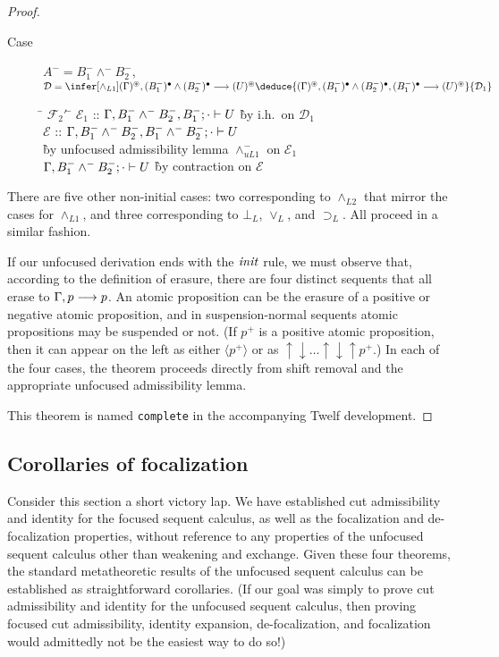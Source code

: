 \documentclass[acmtocl]{robtrans}\pdfoutput=1
\newcommand{\seq}[2]{{#1} \longrightarrow {#2} \mathstrut}
\newcommand{\susp}[1]{\langle{#1}\rangle}
\newcommand{\ifoc}[3]{{#1}; {#2} \vdash {#3} \mathstrut}
\begin{document}
\begin{proof}
\begin{description}
\item[Case] $A^- = B_1^- \wedge^- B_2^-$, \quad
$\mathcal D = \infer[\wedge_{L1}]
{\seq{(\Gamma)^\circledast, (B_1^-)^\bullet \wedge (B_2^-)^\bullet}{(U)^\circledast}}
{\deduce{\seq{(\Gamma)^\circledast, (B_1^-)^\bullet \wedge (B_2^-)^\bullet, (B_1^-)^\bullet}{(U)^\circledast}}{\mathcal D_1}}$

\begin{tabbing}
\qquad \= $\mathcal F_2'$ \= \kill
\>
$\mathcal E_1$ \> ::
 $\ifoc{\Gamma, B_1^- \wedge^- B_2^-, B_1^-}{\cdot}{U}$
  \` by i.h.~on $\mathcal D_1$\\
\> $\mathcal E$ \> ::
$\ifoc{\Gamma, B_1^- \wedge^- B_2^-, B_1^- \wedge^- B_2^-}{\cdot}{U}$\\
  \` by unfocused admissibility lemma $\wedge^-_{uL1}$ on $\mathcal E_1$ \\
\> $\ifoc{\Gamma, B_1^- \wedge^- B_2^-}{\cdot}{U}$
  \` by contraction on $\mathcal E$
\end{tabbing}

\end{description}
There are five other non-initial cases: two corresponding to
$\wedge_{L2}$ that mirror the cases for $\wedge_{L1}$, and three
corresponding to $\bot_L$, $\vee_L$,
and $\supset_L$. All proceed in a similar fashion. 

If our unfocused derivation ends with the ${\it init}$ rule, we must
observe that, according to the definition of erasure, there are four
distinct sequents that all erase to $\seq{\Gamma, p}{p}$.  An atomic
proposition can be the erasure of a positive or negative atomic
proposition, and in suspension-normal sequents atomic
propositions may be suspended or not.  (If $p^+$ is a positive atomic
proposition, then it can appear on the left as either $\susp{p^+}$ or
as ${\uparrow}{\downarrow}\ldots{\uparrow}{\downarrow}{\uparrow}p^+$.)
In each of the four cases, the theorem proceeds directly from shift
removal and the appropriate unfocused admissibility lemma.

This
theorem is named {\tt complete} in the accompanying Twelf development.
\end{proof}

\subsection{Corollaries of focalization}\label{ref:corollaries}

Consider this section a short victory lap. We have established cut
admissibility and identity for the focused sequent calculus, as well
as the focalization and de-focalization properties, without reference
to any properties of the unfocused sequent calculus other than
weakening and exchange. Given these four theorems, the standard
metatheoretic results of the unfocused sequent calculus can be
established as straightforward corollaries. (If our goal was simply to
prove cut admissibility and identity for the unfocused sequent
calculus, then proving focused cut admissibility, identity expansion,
de-focalization, and focalization would admittedly not be the easiest
way to do so!)
\end{document}
